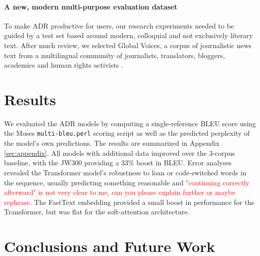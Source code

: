 \documentclass{article} %
\newcommand{\David}[1]{\textcolor{red}{#1}}
\begin{document}
\paragraph{A new, modern multi-purpose evaluation dataset}\label{sec:evaldataset} To make ADR productive for users, our research experiments needed to be guided by a test set based around modern, colloquial and not exclusively literary text. After much review, we selected Global Voices, a corpus of journalistic news text %
from a multilingual community of journalists, translators, bloggers, academics and human rights activists \citep{global_voices}.



\section{Results}\label{sec:results}
We evaluated the ADR models by computing a single-reference BLEU score using the Moses \texttt{multi-bleu.perl} scoring script as well as the predicted perplexity of the model's own predictions. The results are summarized in Appendix \ref{sec:appendix}. All models with additional data improved over the 3-corpus baseline, with the JW300 providing a 33\% boost in BLEU. Error analyses revealed the Transformer model's robustness to loan or code-switched words in the sequence, usually predicting something reasonable and \David{"continuing correctly afterward" is not very clear to me, can you please explain further or maybe rephrase}. The FastText embedding provided a small boost in performance for the Transformer, but was flat for the soft-attention architecture. 
  
\section{Conclusions and Future Work}
\end{document}
